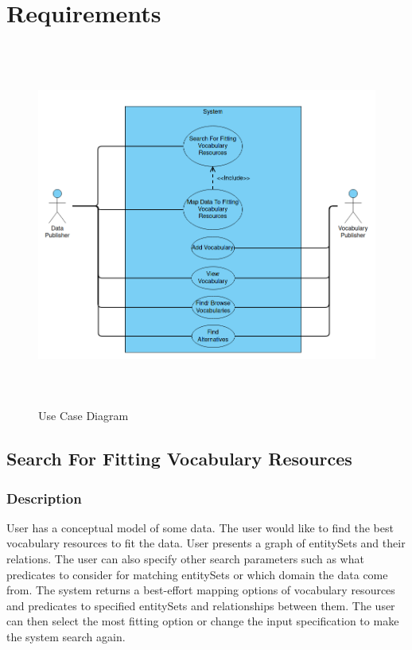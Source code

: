 \chapter{Requirements}
\begin{figure}[h!]\centering
\includegraphics[width=120mm, height=120mm]{../img/use-case-diagram.png}
\caption{Use Case Diagram}
\label{fig:use-case}
\end{figure}                            
\section{Search For Fitting Vocabulary Resources}
\label{sec:fit-vocab-res}

\subsection{Description}
User has a conceptual model of some data. The user would like to find the best vocabulary resources to fit the data. User presents a graph of entitySets and their relations. The user can also specify other search parameters such as what predicates to consider for matching entitySets or which domain the data come from. The system returns a best-effort mapping options of vocabulary resources and predicates to specified entitySets and relationships between them. The user can then select the most fitting option or change the input specification to make the system search again.


